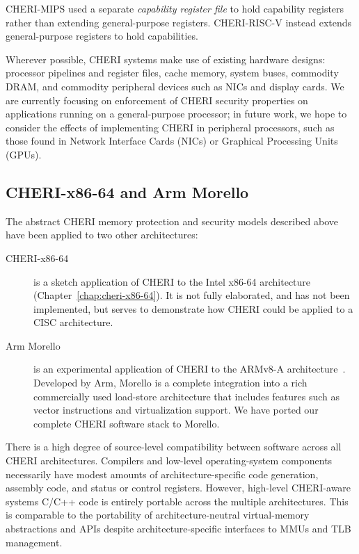 CHERI-MIPS used a separate \textit{capability register file} to hold
capability registers rather than extending general-purpose registers.
CHERI-RISC-V instead extends general-purpose registers to hold
capabilities.

Wherever possible, CHERI systems make use of existing hardware designs: processor pipelines and register files, cache memory,
system buses, commodity DRAM, and commodity peripheral devices such as
NICs and display cards.
We are currently focusing on enforcement of CHERI security properties on applications
running on a general-purpose processor; in future work, we hope to consider the effects of
implementing CHERI in peripheral processors, such as those found in Network Interface Cards (NICs) or Graphical Processing Units (GPUs).

\subsection{CHERI-x86-64 and Arm Morello}

The abstract CHERI memory protection and security models described above have
been applied to two other architectures:

\begin{description}
\item[CHERI-x86-64] is a sketch application of CHERI to the Intel x86-64
  architecture (Chapter~\ref{chap:cheri-x86-64}).
  It is not fully elaborated, and has not been implemented, but serves to
  demonstrate how CHERI could be applied to a CISC architecture.

\item[Arm Morello] is an experimental application of CHERI to the ARMv8-A
  architecture~\cite{arm-morello}.  Developed by Arm, Morello is a complete
  integration into
  a rich commercially used load-store architecture that includes features
  such as vector instructions and virtualization support.
  We have ported our complete CHERI software stack to Morello.
\end{description}

There is a high degree of source-level compatibility between software across
all CHERI architectures.
Compilers and low-level operating-system components necessarily have modest
amounts of architecture-specific code generation, assembly code, and status
or control registers.
However, high-level CHERI-aware systems C/C++ code is entirely portable across
the multiple architectures.
This is comparable to the portability of architecture-neutral virtual-memory
abstractions and APIs despite architecture-specific interfaces to MMUs and
TLB management.

